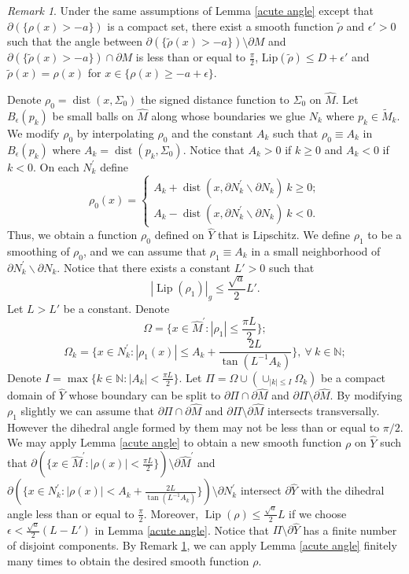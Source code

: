 \documentclass[11pt,letterpaper]{amsart}
\theoremstyle{definition}
\theoremstyle{remark}
\newtheorem{remark}[theorem]{Remark}
\numberwithin{equation}{section}
\begin{document}
\begin{remark}\label{acute angle 2}
    Under the same assumptions of Lemma \ref{acute angle} except that $\partial(\{\rho(x)>-a\})$ is a compact set, there exist a smooth function $\tilde{\rho}$ and $\epsilon'>0$ such that  the angle between $\partial (\{\tilde{\rho}(x)> -a\})\setminus \partial M$ and $\partial (\{\tilde{\rho}(x)> -a\})\cap \partial M$ is less than or equal to $\frac{\pi}{2}$, $\text{Lip}(\tilde{\rho})\leq D+\epsilon'$ and $\tilde{\rho}(x)=\rho(x)$ for $x\in \{\rho(x)\geq -a+\epsilon\}$. 
\end{remark}

Denote $\rho_0=\operatorname{dist}(x,\Sigma_0)$ the signed distance function to $\Sigma_0$ on $\hat{M}$. Let $B_\epsilon(p_k)$ be small balls on $\hat{M}$ along whose boundaries we glue $N_k$ where $p_k\in \tilde{M}_k$. We modify $\rho_0$ by interpolating $\rho_0$ and the constant $A_k$ such that $\rho_0\equiv A_k$ in $B_{\epsilon}(p_k)$ where $A_k=\operatorname{dist}(p_k,\Sigma_0)$. Notice that $A_k> 0$ if $k\geq0$ and $A_k< 0$ if $k<0$. On each $N_k^{'}$ define
\[\rho_0(x)=\begin{cases}
    A_k+\operatorname{dist}(x,\partial N_k^{'}\backslash \partial N_{k})\ k\geq 0;\\
    A_k-\operatorname{dist}(x,\partial N_k^{'}\backslash \partial N_{k}) \ k<0.
\end{cases}\]
Thus, we obtain a function $\rho_0$ defined on $\hat{Y}$ that is Lipschitz.
We define $\rho_1$ to be a smoothing of $\rho_0$, and we can assume that $\rho_1\equiv A_k$ in a small neighborhood of $\partial N_k^{'}\backslash \partial N_{k}$. Notice that there exists a constant $L'>0$ such that
\[|\operatorname{Lip}(\rho_1)|_g\leq \frac{\sqrt{a}}{2}L'.\]
Let $L>L'$ be a constant. Denote
\[\Omega=\{x\in \hat{M}^{'}:|\rho_1|\leq \frac{\pi L}{2}\};\]
\[\Omega_k=\{x\in N_k^{'}: |\rho_1(x)|\leq A_{k}+\frac{2L}{\tan(L^{-1}A_{k})}\}, \ \forall \ k\in \mathbb{N};\]
Denote $I=\max\{k\in\mathbb{N}: |A_k|<\frac{\pi L}{2}\}$. Let $\Pi =\Omega\cup (\cup_{|k|\leq I}\Omega_k)$ be a compact domain of $\hat{Y}$ whose boundary can be split to $\partial\Pi\cap\partial \hat{M}$ and $\partial\Pi\setminus\partial \hat{M}$. By modifying $\rho_1$ slightly we can assume that $\partial\Pi\cap\partial \hat{M}$ and $\partial\Pi\setminus\partial \hat{M}$ intersects transversally. However the dihedral angle formed by them may not be less than or equal to $\pi/2$. We may apply Lemma \ref{acute angle} to obtain a new smooth function $\rho$ on $\hat{Y}$ such that $\partial(\{x\in \hat{M}^{'}:|\rho(x)|<\frac{\pi L}{2}\})\setminus \partial \hat{M}^{'}$ and $\partial(\{x\in N_k^{'}: |\rho(x)|<A_{k}+\frac{2L}{\tan(L^{-1}A_{k})}\})\setminus \partial N_k^{'}$ intersect $\partial \hat{Y}$ with the dihedral angle less than or equal to $\frac{\pi}{2}$. Moreover, $\operatorname{Lip}(\rho)\leq \frac{\sqrt{a}}{2}L $ if we choose $\epsilon<\frac{\sqrt{a}}{2}(L-L')$ in Lemma \ref{acute angle}. Notice that $\Pi\setminus \partial \hat{Y}$ has a finite number of disjoint components. By Remark \ref{acute angle 2}, we can apply  Lemma \ref{acute angle} finitely many times to obtain the desired smooth function $\rho.$
\end{document}
